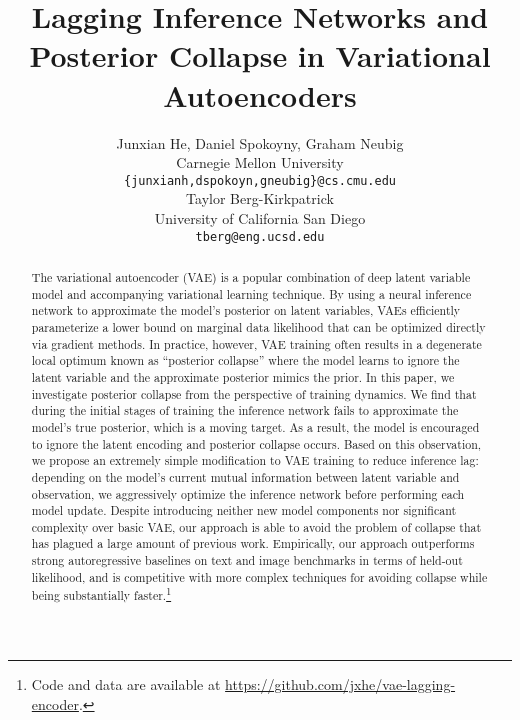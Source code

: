 \documentclass{article} \usepackage{iclr2019_conference,times}
\title{Lagging Inference Networks and Posterior Collapse in Variational Autoencoders}
\author{Junxian He, Daniel Spokoyny, Graham Neubig \\
Carnegie Mellon University\\
\texttt{\{junxianh,dspokoyn,gneubig\}@cs.cmu.edu} \\
\And
Taylor Berg-Kirkpatrick \\
University of California San Diego\\
\texttt{tberg@eng.ucsd.edu} 
}
\begin{document}
\maketitle

\begin{abstract}
The variational autoencoder (VAE) is a popular combination of deep latent variable model and accompanying variational learning technique. By using a neural inference network to approximate the model's posterior on latent variables, VAEs efficiently parameterize a lower bound on marginal data likelihood that can be optimized directly via gradient methods.
In practice, however, VAE training often results in a degenerate local optimum known as ``posterior collapse''
where the model learns to ignore the latent variable and the approximate posterior mimics the prior.
In this paper, we investigate posterior collapse from the perspective of training dynamics. We find that during the initial stages of training the inference network fails to approximate the model's true posterior, which is a moving target. As a result, the model is encouraged to ignore the latent encoding and posterior collapse occurs.
Based on this observation, we propose an extremely simple modification to VAE training to reduce inference lag: depending on the model's current mutual information between latent variable and observation, we aggressively optimize the inference network before performing each model update. Despite introducing neither new model components nor significant complexity over basic VAE, our approach is able to avoid the problem of collapse that has plagued a large amount of previous work.
Empirically, our approach outperforms strong autoregressive baselines on text and image benchmarks in terms of held-out likelihood, and is competitive with more complex techniques for avoiding collapse while being substantially faster.\footnote{Code and data are available at \href{https://github.com/jxhe/vae-lagging-encoder}{https://github.com/jxhe/vae-lagging-encoder}.}
\end{abstract}
\end{document}
